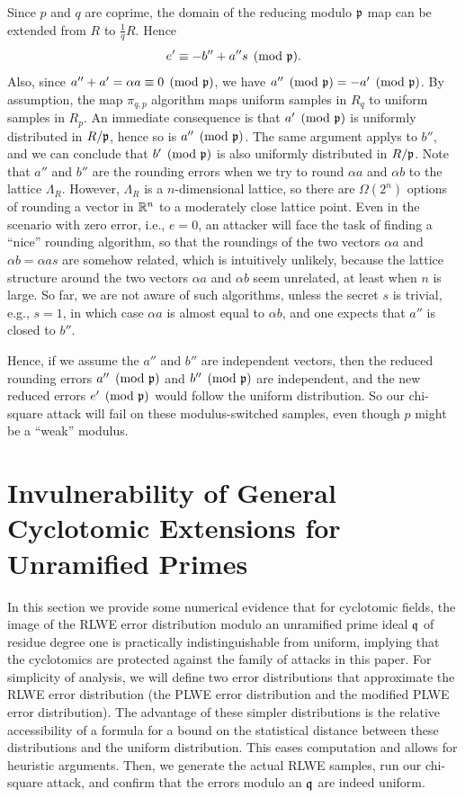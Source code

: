 \documentclass[envcountsect]{llncs}
\begin{document}
Since $p$ and $q$ are coprime, the domain of the reducing modulo $\mathfrak{p}$ map can be extended from $R$ to $\frac{1}{q}R$. Hence $$e' \equiv - b'' + a'' s \pmod{\mathfrak{p}}.$$ Also, since $a'' + a' = \alpha a \equiv 0 \pmod {\mathfrak{p}}$, we have $a'' \pmod{\mathfrak{p}} = -a' \pmod{\mathfrak{p}}$. By assumption, the map $\pi_{q,p}$ algorithm maps uniform samples in $R_q$ to uniform samples in $R_p$. An immediate consequence is that $a' \pmod{\mathfrak{p}}$ is uniformly distributed in $R/\mathfrak{p}$, hence so is $a'' \pmod{\mathfrak{p}}$. The same argument applys to $b''$, and we can conclude that $b' \pmod{\mathfrak{p}}$ is also uniformly distributed in $R/\mathfrak{p}$. Note that $a''$ and $b''$ are the rounding errors when we try to round $\alpha a$ and $\alpha b$ to the lattice $\Lambda_R$. However, $\Lambda_R$ is a $n$-dimensional lattice, so there are $\Omega(2^n)$ options of rounding a vector in $\mathbb{R}^n$ to a moderately close lattice point. Even in the scenario with zero error, i.e., $e = 0$, an attacker will face the task of finding a ``nice'' rounding algorithm, so that the roundings of the two vectors $\alpha a$ and $\alpha b = \alpha a s$ are somehow related, which is intuitively unlikely, because the lattice structure around the two vectors $\alpha a$ and $\alpha b$  seem unrelated, at least when $n$ is large. So far, we are not aware of such algorithms, unless the secret $s$ is trivial, e.g., $s = 1$, in which case $\alpha a$ is almost equal to $\alpha b$, and one expects that $a''$ is closed to $b''$. 

Hence, if we assume the $a''$ and $b''$ are independent vectors, then the reduced rounding errors $a'' \pmod{\mathfrak{p}}$ and $b'' \pmod{\mathfrak{p}}$ are independent, and the new reduced errors $e' \pmod{\mathfrak{p}}$ would follow the uniform distribution. So our chi-square attack will fail on these modulus-switched samples, even though $p$ might be a ``weak'' modulus.


\section{Invulnerability of General Cyclotomic Extensions for Unramified Primes}
\label{sec: cyclo-secure}

In this section we provide some numerical evidence that for cyclotomic fields, the image of the RLWE error distribution modulo an unramified prime ideal $\mathfrak{q}$ of residue degree one is practically indistinguishable from uniform, implying that the cyclotomics are protected against the family of attacks in this paper.  For simplicity of analysis, we will define two error distributions that approximate the RLWE error distribution (the PLWE error distribution and the modified PLWE error distribution).  The advantage of these simpler distributions is the relative accessibility of a formula for a bound on the statistical distance between these distributions and the uniform distribution.  This eases computation and allows for heuristic arguments. Then, we generate the actual RLWE samples, run our chi-square attack, and confirm that the errors modulo an $\mathfrak{q}$ are indeed uniform.
\end{document}

